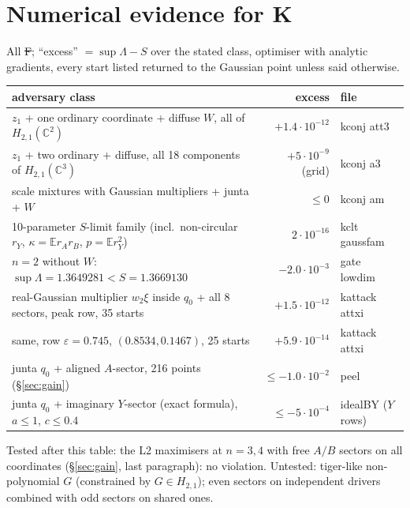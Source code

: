\documentclass[11pt,a4paper]{article}
\newcommand{\C}{\mathbb{C}}\newcommand{\R}{\mathbb{R}}\newcommand{\E}{\mathbb{E}}\newcommand{\Hc}[2]{H_{#1,#2}}
\begin{document}
\section{Numerical evidence for K}\label{sec:evidence}
All \st{F}; ``excess'' $=\sup\Lambda-S$ over the stated class, optimiser with analytic gradients, every start listed returned to the Gaussian point unless said otherwise.
\begin{center}\small\begin{tabular}{p{9.6cm}rl}\toprule
adversary class & excess & file\\\midrule
$z_1$ + one ordinary coordinate + diffuse $W$, all of $\Hc21(\C^2)$ & $+1.4\cdot10^{-12}$ & kconj att3\\
$z_1$ + two ordinary + diffuse, all 18 components of $\Hc21(\C^3)$ & $+5\cdot10^{-9}$ (grid) & kconj a3\\
scale mixtures with Gaussian multipliers + junta + $W$ & $\le0$ & kconj am\\
10-parameter $S$-limit family (incl.\ non-circular $r_Y$, $\kappa=\E r_Ar_B$, $p=\E r_Y^2$) & $2\cdot10^{-16}$ & kclt gaussfam\\
$n=2$ without $W$: $\sup\Lambda=1.3649281<S=1.3669130$ & $-2.0\cdot10^{-3}$ & gate lowdim\\
real-Gaussian multiplier $w_2\xi$ inside $q_0$ + all 8 sectors, peak row, 35 starts & $+1.5\cdot10^{-12}$ & kattack attxi\\
same, row $\varepsilon=0.745$, $(0.8534,0.1467)$, 25 starts & $+5.9\cdot10^{-14}$ & kattack attxi\\
junta $q_0$ + aligned $A$-sector, 216 points (\S\ref{sec:gain}) & $\le-1.0\cdot10^{-2}$ & peel\\
junta $q_0$ + imaginary $Y$-sector (exact formula), $a\le1$, $c\le0.4$ & $\le-5\cdot10^{-4}$ & idealBY ($Y$ rows)\\\bottomrule\end{tabular}\end{center}
Tested after this table: the L2 maximisers at $n=3,4$ with free $A/B$ sectors on all coordinates (\S\ref{sec:gain}, last paragraph): no violation. Untested: tiger-like non-polynomial $G$ (constrained by $G\in\Hc21$); even sectors on independent drivers combined with odd sectors on shared ones.
\end{document}
